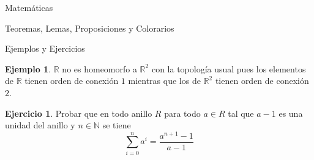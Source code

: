 \documentclass{article}
\theoremstyle{theorem-style}  %
\theoremstyle{definition}
\theoremstyle{example-style}
\newtheorem{example}{Ejemplo}[section]
\newtheorem{exercise}{Ejercicio}[section]
\begin{document}
\begin{section}{Matemáticas}
\begin{subsection}{Teoremas, Lemas, Proposiciones y Colorarios}
\end{subsection}

\begin{subsection}{Ejemplos y Ejercicios}

\begin{example}
$\mathbb{R}$ no es homeomorfo a $\mathbb{R}^2$ con la topología usual pues los elementos de 
$\mathbb{R}$ tienen orden de conexión $1$ mientras que los de $\mathbb{R}^2$ tienen orden
de conexión $2$.
\end{example}

\begin{exercise}
Probar que en todo anillo $R$ para todo $a \in R$ tal que $a-1$ es una unidad del anillo y 
$n \in \mathbb{N}$ se tiene
\begin{equation}
\sum^n_{i=0} a^i = \frac{a^{n+1}-1}{a-1}
\end{equation}

\end{exercise}

\end{subsection}

\end{section}
\end{document}
